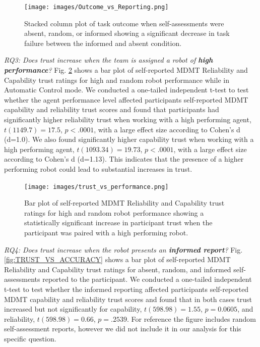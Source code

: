 \documentclass[aaai]{article}
\begin{document}
\begin{figure}[htbp]
    \centering
    \texttt{[image: images/Outcome\_vs\_Reporting.png]}
    \caption{Stacked column plot of task outcome when self-assessments were absent, random, or informed showing a significant decrease in task failure between the informed and absent condition.}
    \label{fig:OUTCOME_VS_ACCURATE}
\end{figure}

\emph{RQ3: Does trust increase when the team is assigned a robot of \textbf{high performance}?} Fig. \ref{fig:TRUST_VS_PERFORMANCE} shows a bar plot of self-reported MDMT Reliability and Capability trust ratings for high and random robot performance while in Automatic Control mode. We conducted a one-tailed independent t-test to test whether the agent performance level affected participants self-reported MDMT capability and reliability trust scores and found that participants had significantly higher reliability trust when working with a high performing agent, $t(1149.7)=17.5$, $p<.0001$, with a large effect size according to Cohen's d (d=1.0). We also found significantly higher capability trust when working with a high performing agent, $t(1093.34)=19.73$, $p<.0001$, with a large effect size according to Cohen's d (d=1.13). This indicates that the presence of a higher performing robot could lead to substantial increases in trust.

\begin{figure}[htbp]
    \centering
    \texttt{[image: images/trust\_vs\_performance.png]}
    \caption{Bar plot of self-reported MDMT Reliability and Capability trust ratings for high and random robot performance showing a statistically significant increase in participant trust when the participant was paired with a high performing robot.}
    \label{fig:TRUST_VS_PERFORMANCE}
\end{figure}

\emph{RQ4: Does trust increase when the robot presents an \textbf{informed report}?} Fig. \ref{fig:TRUST_VS_ACCURACY} shows a bar plot of self-reported MDMT Reliability and Capability trust ratings for absent, random, and informed self-assessments reported to the participant. We conducted a one-tailed independent t-test to test whether the informed reporting affected participants self-reported MDMT capability and reliability trust scores and found that in both cases trust increased but not significantly for capability, $t(598.98)=1.55$, $p=0.0605$, and reliability, $t(598.98)=0.66$, $p=.2539$. For reference the figure includes random self-assessment reports, however we did not include it in our analysis for this specific question.
\end{document}
